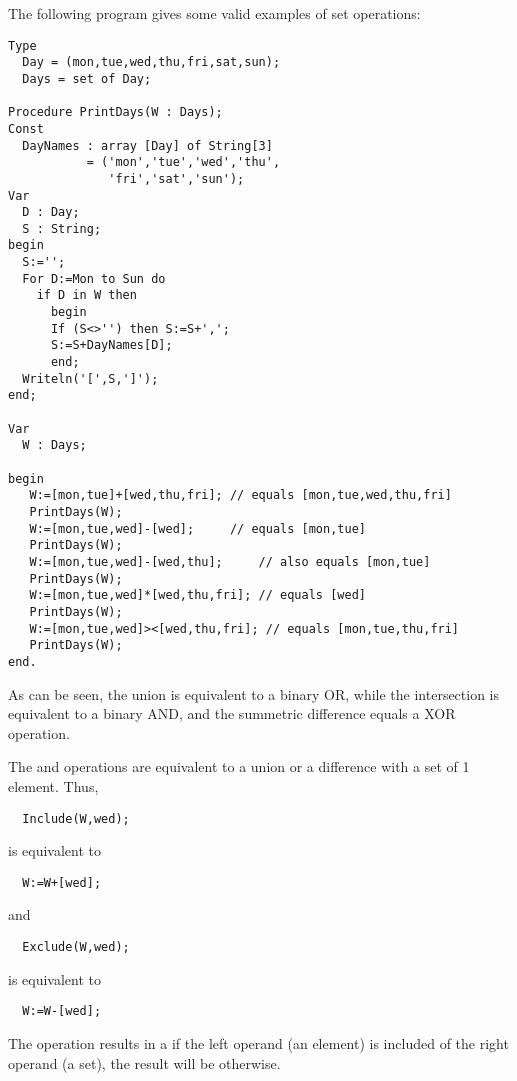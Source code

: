 The following program gives some valid examples of set operations:
\begin{verbatim}
Type
  Day = (mon,tue,wed,thu,fri,sat,sun);
  Days = set of Day;

Procedure PrintDays(W : Days);
Const
  DayNames : array [Day] of String[3]
           = ('mon','tue','wed','thu',
              'fri','sat','sun');
Var
  D : Day;
  S : String;
begin
  S:='';
  For D:=Mon to Sun do
    if D in W then
      begin
      If (S<>'') then S:=S+',';
      S:=S+DayNames[D];
      end;
  Writeln('[',S,']');
end;

Var
  W : Days;

begin
   W:=[mon,tue]+[wed,thu,fri]; // equals [mon,tue,wed,thu,fri]
   PrintDays(W);
   W:=[mon,tue,wed]-[wed];     // equals [mon,tue]
   PrintDays(W);
   W:=[mon,tue,wed]-[wed,thu];     // also equals [mon,tue]
   PrintDays(W);
   W:=[mon,tue,wed]*[wed,thu,fri]; // equals [wed]
   PrintDays(W);
   W:=[mon,tue,wed]><[wed,thu,fri]; // equals [mon,tue,thu,fri]
   PrintDays(W);
end. 
\end{verbatim}
As can be seen, the union is equivalent to a binary OR, while the
intersection is equivalent to a binary AND, and the summetric difference
equals a XOR operation.

The  and  operations are equivalent to a union
or a difference with a set of 1 element. Thus,
\begin{verbatim}
  Include(W,wed);
\end{verbatim}
is equivalent to 
\begin{verbatim}
  W:=W+[wed];
\end{verbatim}
and
\begin{verbatim}
  Exclude(W,wed);
\end{verbatim}
is equivalent to
\begin{verbatim}
  W:=W-[wed];
\end{verbatim}

The  operation results in a  if the left operand
(an element) is included of the right operand (a set), the result
will be  otherwise.

%
